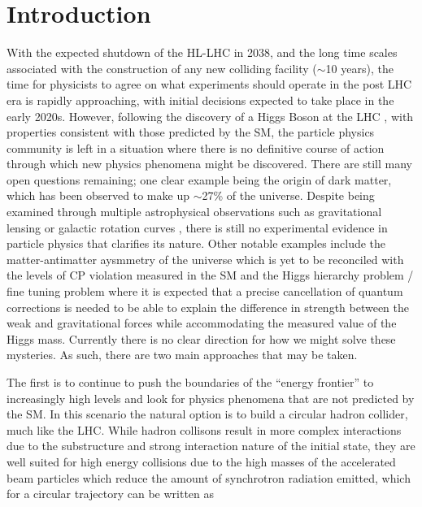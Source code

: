 \chapter{Introduction}

With the expected shutdown of the \ac{HL-LHC} in 2038, and the long time scales associated with the construction of any new colliding facility ($\sim$10 years), the time for physicists to agree on what experiments should operate in the post \ac{LHC} era is rapidly approaching, with initial decisions expected to take place in the early 2020s. However, following the discovery of a Higgs Boson at the \ac{LHC} \cite{:2012gk,Chatrchyan:2012xdj}, with properties consistent with those predicted by the \ac{SM}\cite{Khachatryan:2014jba,Aad:2015gba,Khachatryan:2016vau}, the particle physics community is left in a situation where there is no definitive course of action through which new physics phenomena might be discovered. There are still many open questions remaining; one clear example being the origin of dark matter, which has been observed to make up $\sim$27\% of the universe. Despite being examined through multiple astrophysical observations such as gravitational lensing or galactic rotation curves \cite{Trimble:1987ee}, there is still no experimental evidence in particle physics that clarifies its nature. Other notable examples include the matter-antimatter aysmmetry of the universe which is yet to be reconciled with the levels of CP violation measured in the \ac{SM}\cite{Patrignani:2016xqp} and the Higgs hierarchy problem / fine tuning problem\cite{Baer:2012cf} where it is expected that a precise cancellation of quantum corrections is needed to be able to explain the difference in strength between the weak and gravitational forces while accommodating the measured value of the Higgs mass. Currently there is no clear direction for how we might solve these mysteries. As such, there are two main approaches that may be taken.

The first is to continue to push the boundaries of the ``energy frontier'' to increasingly high levels and look for physics phenomena that are not predicted by the \ac{SM}. In this scenario the natural option is to build a circular hadron collider, much like the \ac{LHC}. While hadron collisons result in more complex interactions due to the substructure and strong interaction nature of the initial state, they are well suited for high energy collisions due to the high masses of the accelerated beam particles which reduce the amount of synchrotron radiation emitted, which for a circular trajectory can be written as

